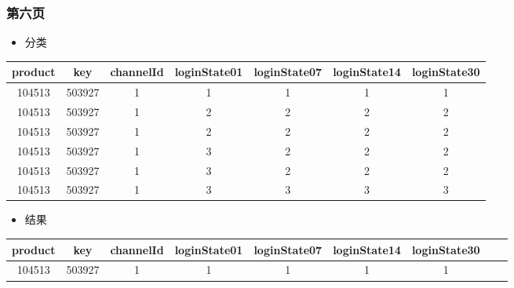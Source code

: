 \documentclass[notheorems,mathserif,table,Singapore]{beamer}
\begin{document}
\begin{frame}
\frametitle{第六页}
\begin{itemize}
\item \small 分类
\end{itemize}
\begin{table}\tiny
\begin{tabular}{c  c c c c c c }
\hline
product & key & channelId &  loginState01 & loginState07 & loginState14 & loginState30 \\
\hline
104513 & 503927 & 1   &       1      &     1        &    1  &    1\\ 
104513 & 503927 & 1   &       2      &     2        &    2  &    2\\  
104513 & 503927 & 1   &       2      &     2        &    2  &    2\\   
104513 & 503927 & 1   &       3      &     2        &    2  &    2\\ 
104513 & 503927 & 1   &       3      &     2        &    2  &    2\\ 
104513 & 503927 & 1   &       3      &     3        &    3  &    3\\ 
\hline
\end{tabular}
\end{table}
\begin{itemize}
\item 结果
\end{itemize}
\begin{table}\tiny
\begin{tabular}{c c c c c c c c c}
\hline
product & key & channelId &  loginState01 & loginState07 & loginState14 & loginState30\\
\hline
104513 & 503927 & 1   &       1      &     1        &    1  &    1 \\ 
\hline
\end{tabular}
\end{table}
\end{frame}
\end{document}
